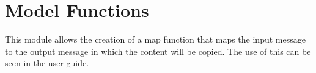 \section{Model Functions}

This module allows the creation of a map function that maps the input message to the output message in which the content will be copied.
The use of this can be seen in the user guide.